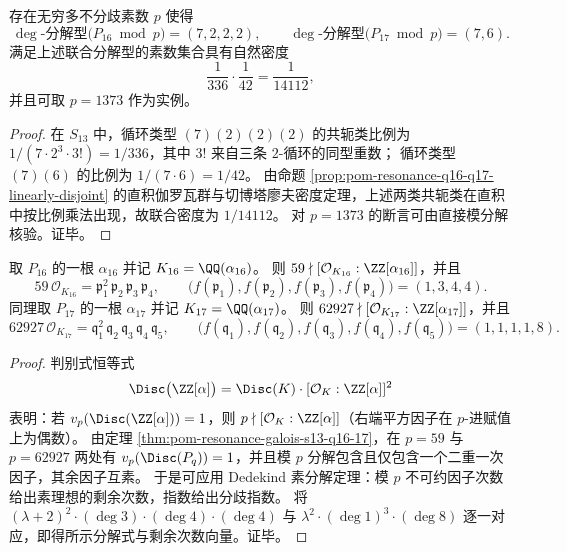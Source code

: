 \begin{corollary}[联合分解型的正密度实现]\label{cor:pom-resonance-q16-q17-joint-splitting-type-density}
存在无穷多不分歧素数 \(p\) 使得
\[
\deg\text{-分解型}\bigl(P_{16}\bmod p\bigr)=(7,2,2,2),\qquad
\deg\text{-分解型}\bigl(P_{17}\bmod p\bigr)=(7,6).
\]
满足上述联合分解型的素数集合具有自然密度
\[
\frac{1}{336}\cdot\frac{1}{42}=\frac{1}{14112},
\]
并且可取 \(p=1373\) 作为实例。
\end{corollary}
\begin{proof}
在 \(S_{13}\) 中，循环类型 \((7)(2)(2)(2)\) 的共轭类比例为
\(
1/(7\cdot 2^3\cdot 3!)=1/336
\)，其中 \(3!\) 来自三条 \(2\)-循环的同型重数；
循环类型 \((7)(6)\) 的比例为 \(1/(7\cdot 6)=1/42\)。
由命题 \ref{prop:pom-resonance-q16-q17-linearly-disjoint} 的直积伽罗瓦群与切博塔廖夫密度定理，上述两类共轭类在直积中按比例乘法出现，故联合密度为 \(1/14112\)。
对 \(p=1373\) 的断言可由直接模分解核验。证毕。
\end{proof}

\begin{proposition}[一次判别式赋值与素理想分解]\label{prop:pom-resonance-q16-q17-dedekind-factorization}
取 \(P_{16}\) 的一根 \(\alpha_{16}\) 并记 \(K_{16}=\QQ(\alpha_{16})\)。
则 \(59\nmid [\mathcal{O}_{K_{16}}:\ZZ[\alpha_{16}]]\)，并且
\[
59\,\mathcal{O}_{K_{16}}=\mathfrak p_1^{2}\,\mathfrak p_2\,\mathfrak p_3\,\mathfrak p_4,\qquad
\bigl(f(\mathfrak p_1),f(\mathfrak p_2),f(\mathfrak p_3),f(\mathfrak p_4)\bigr)=(1,3,4,4).
\]
同理取 \(P_{17}\) 的一根 \(\alpha_{17}\) 并记 \(K_{17}=\QQ(\alpha_{17})\)。
则 \(62927\nmid [\mathcal{O}_{K_{17}}:\ZZ[\alpha_{17}]]\)，并且
\[
62927\,\mathcal{O}_{K_{17}}=\mathfrak q_1^{2}\,\mathfrak q_2\,\mathfrak q_3\,\mathfrak q_4\,\mathfrak q_5,\qquad
\bigl(f(\mathfrak q_1),f(\mathfrak q_2),f(\mathfrak q_3),f(\mathfrak q_4),f(\mathfrak q_5)\bigr)=(1,1,1,1,8).
\]
\end{proposition}
\begin{proof}
判别式恒等式
\[
\Disc\bigl(\ZZ[\alpha]\bigr)=\Disc(K)\cdot[\mathcal{O}_K:\ZZ[\alpha]]^2
\]
表明：若 \(v_p(\Disc(\ZZ[\alpha]))=1\)，则 \(p\nmid[\mathcal{O}_K:\ZZ[\alpha]]\)（右端平方因子在 \(p\)-进赋值上为偶数）。
由定理 \ref{thm:pom-resonance-galois-s13-q16-17}，在 \(p=59\) 与 \(p=62927\) 两处有 \(v_p(\Disc(P_q))=1\)，并且模 \(p\) 分解包含且仅包含一个二重一次因子，其余因子互素。
于是可应用 Dedekind 素分解定理：模 \(p\) 不可约因子次数给出素理想的剩余次数，指数给出分歧指数。
将 \((\lambda+2)^2\cdot(\deg 3)\cdot(\deg 4)\cdot(\deg 4)\) 与 \(\lambda^2\cdot(\deg 1)^3\cdot(\deg 8)\) 逐一对应，即得所示分解式与剩余次数向量。证毕。
\end{proof}
